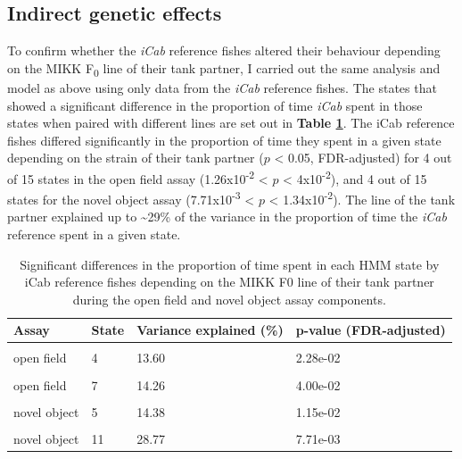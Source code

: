 \documentclass[
]{book}
\begin{document}
\hypertarget{indirect-genetic-effects-1}{%
\subsection{Indirect genetic effects}\label{indirect-genetic-effects-1}}

To confirm whether the \emph{\textcolor{iCab_424B4D}{iCab}} reference fishes altered their behaviour depending on the MIKK F\textsubscript{0} line of their tank partner, I carried out the same analysis and model as above using only data from the \emph{\textcolor{iCab_424B4D}{iCab}} reference fishes. The states that showed a significant difference in the proportion of time \emph{\textcolor{iCab_424B4D}{iCab}} spent in those states when paired with different lines are set out in \textbf{Table \ref{tab:mikk-sge-F0}}. The iCab reference fishes differed significantly in the proportion of time they spent in a given state depending on the strain of their tank partner (\(p\) \textless{} 0.05, FDR-adjusted) for 4 out of 15 states in the open field assay (1.26x10\textsuperscript{-2} \textless{} \(p\) \textless{} 4x10\textsuperscript{-2}), and 4 out of 15 states for the novel object assay (7.71x10\textsuperscript{-3} \textless{} \(p\) \textless{} 1.34x10\textsuperscript{-2}). The line of the tank partner explained up to \textasciitilde29\% of the variance in the proportion of time the \emph{\textcolor{iCab_424B4D}{iCab}} reference spent in a given state.

\begin{table}

\caption{\label{tab:mikk-sge-F0}Significant differences in the proportion of time spent in each HMM state by iCab reference fishes depending on the MIKK F0 line of their tank partner during the open field and novel object assay components.}
\centering
\begin{tabular}[t]{llll}
\toprule
Assay & State & Variance explained (\%) & p-value (FDR-adjusted)\\
\midrule
\cellcolor{gray!6}{open field} & \cellcolor{gray!6}{3} & \cellcolor{gray!6}{14.93} & \cellcolor{gray!6}{2.10e-02}\\
open field & 4 & 13.60 & 2.28e-02\\
\cellcolor{gray!6}{open field} & \cellcolor{gray!6}{5} & \cellcolor{gray!6}{15.33} & \cellcolor{gray!6}{1.26e-02}\\
open field & 7 & 14.26 & 4.00e-02\\
\cellcolor{gray!6}{novel object} & \cellcolor{gray!6}{4} & \cellcolor{gray!6}{14.33} & \cellcolor{gray!6}{1.23e-02}\\
\addlinespace
novel object & 5 & 14.38 & 1.15e-02\\
\cellcolor{gray!6}{novel object} & \cellcolor{gray!6}{9} & \cellcolor{gray!6}{24.61} & \cellcolor{gray!6}{1.34e-02}\\
novel object & 11 & 28.77 & 7.71e-03\\
\bottomrule
\end{tabular}
\end{table}
\end{document}
